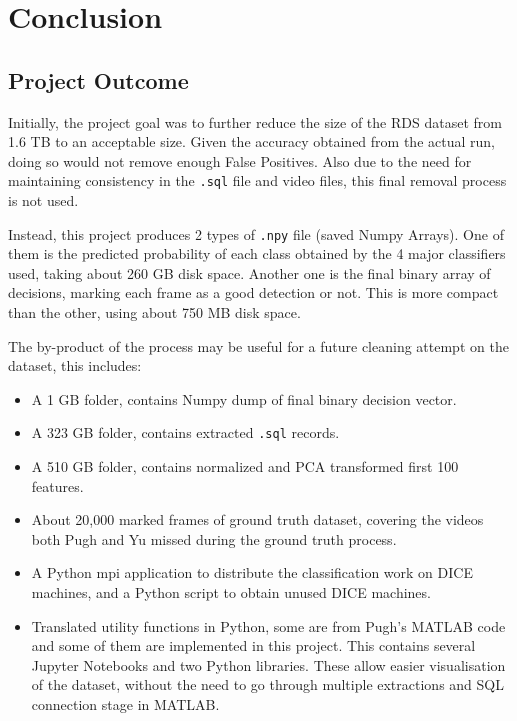 \documentclass[bsc,logo,twoside,fullspacing,parskip]{infthesis}
\begin{document}
\chapter{Conclusion}
\label{chap:conclusion}

\section{Project Outcome}

Initially, the project goal was to further reduce the size of the RDS dataset from 1.6 TB to an acceptable size. 
Given the accuracy obtained from the actual run, doing so would not remove enough False Positives. Also due to the need for maintaining consistency in the {\tt .sql} file and video files, this final removal process is not used.

Instead, this project produces 2 types of {\tt .npy} file (saved Numpy Arrays). 
One of them is the predicted probability of each class obtained by the 4 major classifiers used, taking about 260 GB disk space. 
Another one is the final binary array of decisions, marking each frame as a good detection or not. 
This is more compact than the other, using about 750 MB disk space.

The by-product of the process may be useful for a future cleaning attempt on the dataset, this includes:
\begin{itemize}
\setlength{\parskip}{3pt}
\item A 1 GB folder, contains Numpy dump of final binary decision vector.
\item A 323 GB folder, contains extracted {\tt .sql} records.
\item A 510 GB folder, contains normalized and PCA transformed first 100 features.
\item About 20,000 marked frames of ground truth dataset, covering the videos both Pugh and Yu missed during the ground truth process.
\item A Python mpi application to distribute the classification work on DICE machines, and a Python script to obtain unused DICE machines.
\item Translated utility functions in Python, some are from Pugh's MATLAB code and some of them are implemented in this project. 
This contains several Jupyter Notebooks and two Python libraries. 
These allow easier visualisation of the dataset, without the need to go through multiple extractions and SQL connection stage in MATLAB. 
\end{itemize}
\end{document}
